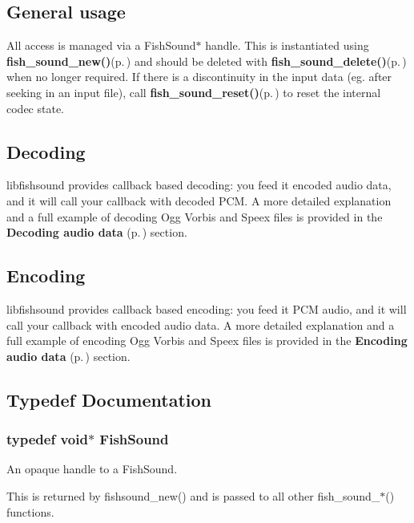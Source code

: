 \subsection{General usage}\label{fishsound_8h_general}
All access is managed via a Fish\-Sound$\ast$ handle. This is instantiated using {\bf fish\_\-sound\_\-new()}{\rm (p.\,\pageref{fishsound_8h_a4})} and should be deleted with {\bf fish\_\-sound\_\-delete()}{\rm (p.\,\pageref{fishsound_8h_a11})} when no longer required. If there is a discontinuity in the input data (eg. after seeking in an input file), call {\bf fish\_\-sound\_\-reset()}{\rm (p.\,\pageref{fishsound_8h_a10})} to reset the internal codec state.\subsection{Decoding}\label{fishsound_8h_decoding}
libfishsound provides callback based decoding: you feed it encoded audio data, and it will call your callback with decoded PCM. A more detailed explanation and a full example of decoding Ogg Vorbis and Speex files is provided in the {\bf Decoding audio data }{\rm (p.\,\pageref{group__decode})} section.\subsection{Encoding}\label{fishsound_8h_encoding}
libfishsound provides callback based encoding: you feed it PCM audio, and it will call your callback with encoded audio data. A more detailed explanation and a full example of encoding Ogg Vorbis and Speex files is provided in the {\bf Encoding audio data }{\rm (p.\,\pageref{group__encode})} section.

\subsection{Typedef Documentation}
\subsubsection{\setlength{\rightskip}{0pt plus 5cm}typedef void$\ast$ {\bf Fish\-Sound}}\label{fishsound_8h_a0}


An opaque handle to a Fish\-Sound. 

This is returned by fishsound\_\-new() and is passed to all other fish\_\-sound\_\-$\ast$() functions. 
